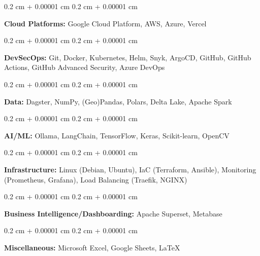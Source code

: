 \documentclass[10pt, a4paper]{article}
\newenvironment{onecolentry}{
    \begin{adjustwidth}{
        0.2 cm + 0.00001 cm
    }{
        0.2 cm + 0.00001 cm
    }
}{
    \end{adjustwidth}
} %
\begin{document}
        \begin{onecolentry}
            \textbf{Cloud Platforms:} Google Cloud Platform, AWS, Azure, Vercel
        \end{onecolentry}

        \vspace{0.2 cm}

        \begin{onecolentry}
            \textbf{DevSecOps:} Git, Docker, Kubernetes, Helm, Snyk, ArgoCD, GitHub, GitHub Actions, GitHub Advanced Security, Azure DevOps

        \end{onecolentry}

        \vspace{0.2 cm}

        \begin{onecolentry}
            \textbf{Data:} Dagster, NumPy, (Geo)Pandas, Polars, Delta Lake, Apache Spark
        \end{onecolentry}

        \vspace{0.2 cm}

        \begin{onecolentry}
            \textbf{AI/ML:} Ollama, LangChain, TensorFlow, Keras, Scikit-learn, OpenCV
        \end{onecolentry}

        \vspace{0.2 cm}

        \begin{onecolentry}
            \textbf{Infrastructure:} Linux (Debian, Ubuntu), IaC (Terraform, Ansible), Monitoring (Prometheus, Grafana),  Load Balancing (Traefik, NGINX)

        \end{onecolentry}

        \vspace{0.2 cm}

        \begin{onecolentry}
            \textbf{Business Intelligence/Dashboarding:} Apache Superset, Metabase
        \end{onecolentry}

        \vspace{0.2 cm}

        \begin{onecolentry}
            \textbf{Miscellaneous:} Microsoft Excel, Google Sheets, LaTeX
        \end{onecolentry}


    
\end{document}

